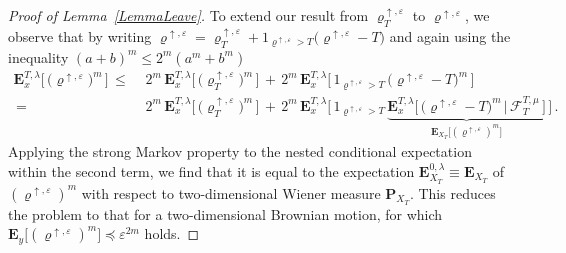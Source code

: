 \documentclass[10pt]{article}
\numberwithin{equation}{section}
\theoremstyle{definition}
\begin{document}
\begin{proof}[Proof of Lemma~\ref{LemmaLeave}]
 To extend  our result from $ \varrho^{\uparrow, \varepsilon}_T$ to $ \varrho^{\uparrow, \varepsilon}$, we observe that by writing $ \varrho^{\uparrow, \varepsilon}=\varrho^{\uparrow, \varepsilon}_T+1_{ \varrho^{\uparrow, \varepsilon} > T }\big(\varrho^{\uparrow, \varepsilon}-T\big)$ and again using the inequality $(a+b)^m\leq 2^m(a^m+b^m)$
 \begin{align*}
    \mathbf{E}_{x}^{T,\lambda}\Big[ \,\big( \varrho^{\uparrow, \varepsilon}\big)^m \, \Big] \,\leq \,&\,    2^m\,\mathbf{E}_{x}^{T,\lambda}\Big[\, \big(\varrho^{\uparrow, \varepsilon}_T\big)^m \,\Big]\,+\,  2^m\,\mathbf{E}_{x}^{T,\lambda}\Big[\,1_{ \varrho^{\uparrow, \varepsilon} > T }\, \big(\varrho^{\uparrow, \varepsilon}-T\big)^m  \,\Big]  \nonumber   \\
    \,=\, & \,  2^m\, \mathbf{E}_{x}^{T,\lambda}\Big[ \,\big(\varrho^{\uparrow, \varepsilon}_T\big)^m \,\Big]\,+\,  2^m\,\mathbf{E}_{x}^{T,\lambda}\bigg[\,1_{ \varrho^{\uparrow, \varepsilon} > T }\,\underbrace{\mathbf{E}_{x}^{T,\lambda}\Big[\, \big(\varrho^{\uparrow, \varepsilon}-T\big)^m\,\Big|\,\mathscr{F}_{T}^{T,\mu} \,\Big]}_{ \mathbf{E}_{X_T}\big[ (\varrho^{\uparrow, \varepsilon})^m  \big]  } \,\bigg]   \,.
 \end{align*}
 Applying the strong Markov property to the nested conditional expectation within the second term, we find that it is equal to the expectation $\mathbf{E}_{X_T}^{0,\lambda}\equiv\mathbf{E}_{X_T}$ of $(\varrho^{\uparrow, \varepsilon})^m$ with respect to two-dimensional Wiener measure $\mathbf{P}_{X_T}$.
This reduces the problem to that for a two-dimensional Brownian motion, for which $\mathbf{E}_{y}\big[ (\varrho^{\uparrow, \varepsilon})^m  \big] \preceq \varepsilon^{2m}$ holds.\vspace{.3cm}



\end{proof}
\end{document}
